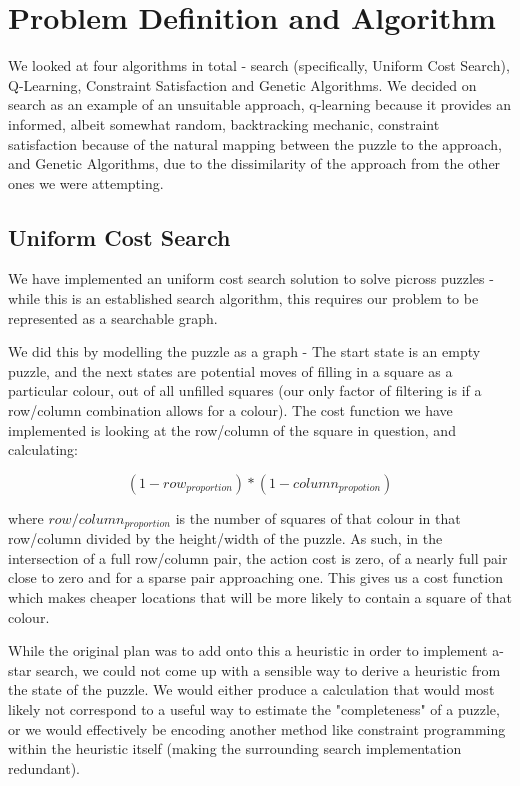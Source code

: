 \documentclass{svproc}
\begin{document}
\section{Problem Definition and Algorithm}
We looked at four algorithms in total - search (specifically, Uniform Cost Search), Q-Learning, Constraint Satisfaction and Genetic Algorithms.
We decided on search as an example of an unsuitable approach, q-learning because it provides an informed, albeit somewhat random, backtracking mechanic, constraint satisfaction because of the natural mapping between the puzzle to the approach, and Genetic Algorithms, due to the dissimilarity of the approach from the other ones we were attempting.

\subsection{Uniform Cost Search}
We have implemented an uniform cost search solution to solve picross puzzles - while this is an established search algorithm, this requires our problem to be represented as a searchable graph.

We did this by modelling the puzzle as a graph - The start state is an empty puzzle, and the next states are potential moves of filling in a square as a particular colour, out of all unfilled squares (our only factor of filtering is if a row/column combination allows for a colour).
The cost function we have implemented is looking at the row/column of the square in question, and calculating:

$$ (1 - row_{proportion}) * (1 - column_{propotion}) $$

where $row/column_{proportion}$ is the number of squares of that colour in that row/column divided by the height/width of the puzzle.
As such, in the intersection of a full row/column pair, the action cost is zero, of a nearly full pair close to zero and for a sparse pair approaching one.
This gives us a cost function which makes cheaper locations that will be more likely to contain a square of that colour.

While the original plan was to add onto this a heuristic in order to implement a-star search, we could not come up with a sensible way to derive a heuristic from the state of the puzzle.
We would either produce a calculation that would most likely not correspond to a useful way to estimate the "completeness" of a puzzle, or we would effectively be encoding another method like constraint programming within the heuristic itself (making the surrounding search implementation redundant).
\end{document}
